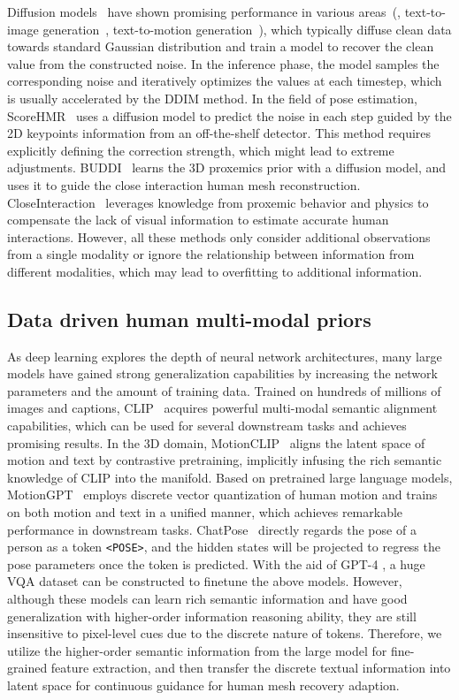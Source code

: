 Diffusion models~\cite{DDPM} have shown promising performance in various areas~(\eg, text-to-image generation~\cite{stable_diffusion}, text-to-motion generation~\cite{MDM}), which typically diffuse clean data towards standard Gaussian distribution and train a model to recover the clean value from the constructed noise. In the inference phase, the model samples the corresponding noise and iteratively optimizes the values at each timestep, which is usually accelerated by the DDIM method. In the field of pose estimation, ScoreHMR~\cite{ScoreHMR} uses a diffusion model to predict the noise in each step guided by the 2D keypoints information from an off-the-shelf detector. This method requires explicitly defining the correction strength, which might lead to extreme adjustments. BUDDI~\cite{BUDDI} learns the 3D proxemics prior with a diffusion model, and uses it to guide the close interaction human mesh reconstruction. CloseInteraction~\cite{CloseInteraction}
leverages knowledge from proxemic behavior and physics to compensate the lack of visual information to estimate accurate human interactions. However, all these methods only consider additional observations from a single modality or ignore the relationship between information from different modalities, which may lead to overfitting to additional information.

\subsection{Data driven human multi-modal priors}

As deep learning explores the depth of neural network architectures, many large models have gained strong generalization capabilities by increasing the network parameters and the amount of training data. Trained on hundreds of millions of images and captions, CLIP~\cite{CLIP} acquires powerful multi-modal semantic alignment capabilities, which can be used for several downstream tasks and achieves promising results. In the 3D domain, MotionCLIP~\cite{MotionCLIP} aligns the latent space of motion and text by contrastive pretraining, implicitly infusing the rich semantic knowledge of CLIP into the manifold. Based on pretrained large language models, MotionGPT~\cite{MotionGPT} employs discrete vector quantization of human motion and trains on both motion and text in a unified manner, which achieves remarkable performance in downstream tasks. ChatPose~\cite{ChatPose} directly regards the pose of a person as a token \texttt {\textless POSE\textgreater}, and the hidden states will be projected to regress the pose parameters once the token is predicted. With the aid of GPT-4 \cite{GPT4}, a huge VQA dataset can be constructed to finetune the above models. However, although these models can learn rich semantic information and have good generalization with higher-order information reasoning ability, they are still insensitive to pixel-level cues due to the discrete nature of tokens. Therefore, we utilize the higher-order semantic information from the large model for fine-grained feature extraction, and then transfer the discrete textual information into latent space for continuous guidance for human mesh recovery adaption.